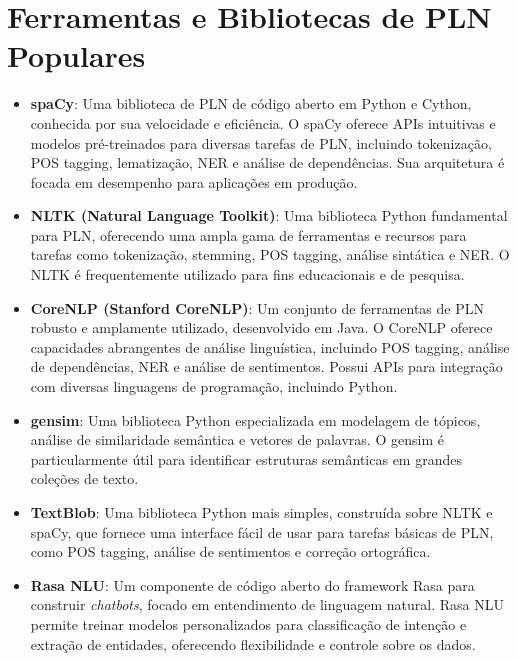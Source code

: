 \documentclass[14pt,a4paper,oneside]{book}
\begin{document}
\section{Ferramentas e Bibliotecas de PLN Populares}

\begin{itemize}
    \item \textbf{spaCy}: Uma biblioteca de PLN de código aberto em Python e Cython, conhecida por sua velocidade e eficiência. O spaCy oferece APIs intuitivas e modelos pré-treinados para diversas tarefas de PLN, incluindo tokenização, POS tagging, lematização, NER e análise de dependências. Sua arquitetura é focada em desempenho para aplicações em produção.
    \item \textbf{NLTK (Natural Language Toolkit)}: Uma biblioteca Python fundamental para PLN, oferecendo uma ampla gama de ferramentas e recursos para tarefas como tokenização, stemming, POS tagging, análise sintática e NER. O NLTK é frequentemente utilizado para fins educacionais e de pesquisa.
    \item \textbf{CoreNLP (Stanford CoreNLP)}: Um conjunto de ferramentas de PLN robusto e amplamente utilizado, desenvolvido em Java. O CoreNLP oferece capacidades abrangentes de análise linguística, incluindo POS tagging, análise de dependências, NER e análise de sentimentos. Possui APIs para integração com diversas linguagens de programação, incluindo Python.
    \item \textbf{gensim}: Uma biblioteca Python especializada em modelagem de tópicos, análise de similaridade semântica e vetores de palavras. O gensim é particularmente útil para identificar estruturas semânticas em grandes coleções de texto.
    \item \textbf{TextBlob}: Uma biblioteca Python mais simples, construída sobre NLTK e spaCy, que fornece uma interface fácil de usar para tarefas básicas de PLN, como POS tagging, análise de sentimentos e correção ortográfica.
    
	
    \item \textbf{Rasa NLU}: Um componente de código aberto do framework Rasa para construir \textit{chatbots}, focado em entendimento de linguagem natural. Rasa NLU permite treinar modelos personalizados para classificação de intenção e extração de entidades, oferecendo flexibilidade e controle sobre os dados.
\end{itemize}
\end{document}

